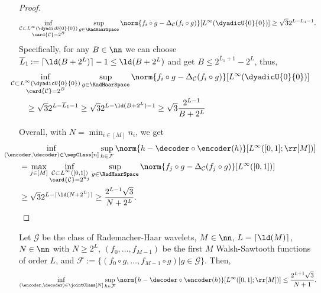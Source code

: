 \documentclass[twoside,11pt]{article}
\newcommand{\defeq}{\mathbin{:=}}
\newcommand{\set}[1]{\ensuremath{\mathcal{#1}}}
\begin{document}
\begin{proof}
\begin{align}
    \inf_{\substack{\set{C}\subset L^\infty(\dyadicU{0}{0})\\\card{\set{C}}=2^B}}\sup_{g\in\RadHaarSpace}\norm{f_i\circ g-\Delta_{\set{C}}(f_i\circ g)}[{L^\infty(\dyadicU{0}{0})}]\geq \sqrt{3}2^{L-L_1-1}.
\end{align}
Specifically, for any $B\in\nn$ we can choose $\overline{L}_1\defeq\lceil\ld(B+2^{L})\rceil-1\leq \ld(B+2^{L})$ and get $B\leq 2^{\overline{L}_1+1}-2^{L}$, thus,
\begin{align}
    &\kern-2em\inf_{\substack{\set{C}\subset L^\infty(\dyadicU{0}{0})\\\card{\set{C}}=2^B}}\sup_{g\in\RadHaarSpace}\norm{f_i\circ g-\Delta_{\set{C}}(f_i\circ g)}[{L^\infty(\dyadicU{0}{0})}]
    \\&
    \geq
    \sqrt{3}
    2^{L-\overline{L}_1-1}
    \geq
    \sqrt{3}2^{L-\ld(B+2^{L})-1}
    \geq
    \sqrt{3}\frac{2^{L-1}}{B+2^{L}}
\end{align}

Overall, with $N=\min_{i\in[M]}n_i$, 
we get
\begin{align}
    &\kern-2em\inf_{(\encoder,\decoder)\in\sepClass[n]}
    \sup_{h\in\set{F}}
    \norm{h-\decoder\circ\encoder(h)}[{L^\infty([0,1];\rr[M])}]
    \\&
    =
    \max_{j\in[M]}\inf_{\substack{\set{C}\subset L^\infty([0,1])\\\card{\set{C}}=2^{n_j}}}\sup_{g\in\RadHaarSpace}\norm{f_j\circ g-\Delta_{\set{C}}(f_j\circ g)}[{L^\infty([0,1])}]
    \\&
    \geq
    \sqrt{3}2^{L-\lceil\ld(N+2^{L})\rceil}
    \geq 
    \frac{2^{L-1}\sqrt{3}}{N+2^{L}}.
\end{align}
\end{proof}

\begin{theorem}
    \label{thm:wavelet_joint}
    Let $\set{G}$ be the class of Rademacher-Haar wavelets, $M\in\nn$, $L=\lceil\ld(M)\rceil$, $N\in\nn$ with $N\geq 2^L$, $(f_0,\ldots,f_{M-1})$ be the first $M$ Walsh-Sawtooth functions of order $L$, and $\set{F}\defeq \{(f_0\circ g,\ldots,f_{M-1}\circ g)|g\in\set{G}\}$.
    Then,
    \begin{align}
        \inf_{(\encoder,\decoder)\in\jointClass[N]}
        \sup_{h\in\set{F}}
        \norm{h-\decoder\circ\encoder(h)}[{L^\infty([0,1];\rr[M])}]
        \leq\frac{2^{L+1}\sqrt{3}}{N+1}.
    \end{align}
\end{theorem}
\end{document}
